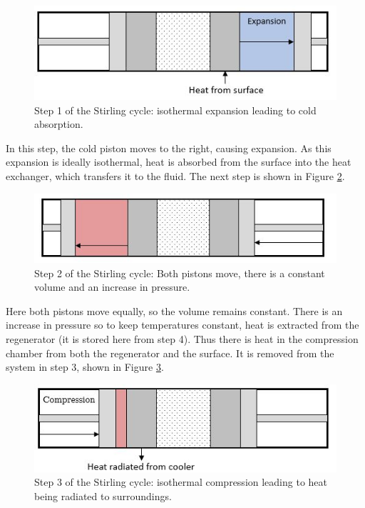 \begin{figure}[h]
\centering
  \includegraphics[width=0.8\linewidth]{chap2_images/stirling_process_cold_absorb.JPG}
  \caption{Step 1 of the Stirling cycle: isothermal expansion leading to cold absorption.}
  \label{fig:stirling_cycle_part_1}
\end{figure}

In this step, the cold piston moves to the right, causing expansion. As this expansion is ideally isothermal, heat is absorbed from the surface into the heat exchanger, which transfers it to the fluid. The next step is shown in Figure \ref{fig:stirling_cycle_part_2}.

\begin{figure}[h]
\centering
  \includegraphics[width=0.8\linewidth]{chap2_images/stirling_process_cold_transfer.JPG}
  \caption{Step 2 of the Stirling cycle: Both pistons move, there is a constant volume and an increase in pressure.}
  \label{fig:stirling_cycle_part_2}
\end{figure}

Here both pistons move equally, so the volume remains constant. There is an increase in pressure so to keep temperatures constant, heat is extracted from the regenerator (it is stored here from step 4). Thus there is heat in the compression chamber from both the regenerator and the surface. It is removed from the system in step 3, shown in Figure \ref{fig:stirling_cycle_part_3}.

\begin{figure}[h]
\centering
  \includegraphics[width=0.8\linewidth]{chap2_images/stirling_process_heat_radiation.JPG}
  \caption{Step 3 of the Stirling cycle: isothermal compression leading to heat being radiated to surroundings.}
  \label{fig:stirling_cycle_part_3}
\end{figure}

